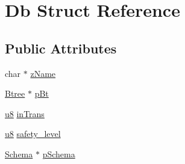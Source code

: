 \hypertarget{struct_db}{\section{Db Struct Reference}
\label{struct_db}
}
\subsection*{Public Attributes}
\begin{DoxyCompactItemize}
\item 
char $\ast$ \hyperlink{struct_db_a6df2b5d7c8fd68e92cea961d9e3b279b}{z\-Name}
\item 
\hyperlink{struct_btree}{Btree} $\ast$ \hyperlink{struct_db_a0633e5a6abfc39246d07cc6a417a5852}{p\-Bt}
\item 
\hyperlink{sqlite3_8c_a74a0f6424ae628af25f23f0a35f6ead3}{u8} \hyperlink{struct_db_a4c5495ebea317212f0b41aa2795a7bc9}{in\-Trans}
\item 
\hyperlink{sqlite3_8c_a74a0f6424ae628af25f23f0a35f6ead3}{u8} \hyperlink{struct_db_a04597a5c023d8b328193450b177ff24c}{safety\-\_\-level}
\item 
\hyperlink{struct_schema}{Schema} $\ast$ \hyperlink{struct_db_afd8647a83a4a7053231b92814520d6d4}{p\-Schema}
\end{DoxyCompactItemize}



